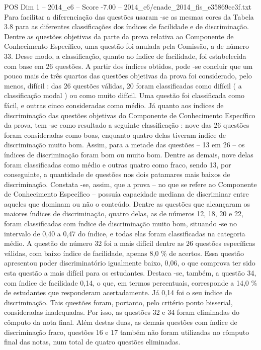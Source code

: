 \begin{textsample}{POS Dim 1 – 2014\_c6 – Score -7.00 – 2014\_c6/enade\_2014\_fis\_e35869ce3f.txt}
Para facilitar a diferenciação das questões usaram -se as mesmas cores da Tabela 3.8 para as diferentes classificações dos índices de facilidade e de discriminação.
Dentre as questões objetivas da parte da prova relativa ao Componente de Conhecimento Específico, uma questão foi anulada pela Comissão, a de número 33.
Desse modo, a classificação, quanto ao índice de facilidade, foi estabelecida com base em 26 questões.
A partir dos índices obtidos, pode -se concluir que um pouco mais de três quartos das questões objetivas da prova foi considerado, pelo menos, difícil : das 26 questões válidas, 20 foram classificadas como difícil ( a classificação modal ) ou como muito difícil.
Uma questão foi classificada como fácil, e outras cinco consideradas como médio.
Já quanto aos índices de discriminação das questões objetivas do Componente de Conhecimento Específico da prova, tem -se como resultado a seguinte classificação : nove das 26 questões foram consideradas como boas, enquanto quatro delas tiveram índice de discriminação muito bom.
Assim, para a metade das questões – 13 em 26 – os índices de discriminação foram bom ou muito bom.
Dentre as demais, nove delas foram classificadas como médio e outras quatro como fraco, sendo 13, por conseguinte, a quantidade de questões nos dois patamares mais baixos de discriminação.
Constata -se, assim, que a prova – no que se refere ao Componente de Conhecimento Específico – possuía capacidade mediana de discriminar entre aqueles que dominam ou não o conteúdo.
Dentre as questões que alcançaram os maiores índices de discriminação, quatro delas, as de números 12, 18, 20 e 22, foram classificadas com índice de discriminação muito bom, situando -se no intervalo de 0,40 a 0,47 do índice, e todas elas foram classificadas na categoria médio.
A questão de número 32 foi a mais difícil dentre as 26 questões específicas válidas, com baixo índice de facilidade, apenas 8,0 \% de acertos.
Essa questão apresentou poder discriminatório igualmente baixo, 0,06, o que comprova ter sido esta questão a mais difícil para os estudantes.
Destaca -se, também, a questão 34, com índice de facilidade 0,14, o que, em termos percentuais, corresponde a 14,0 \% de estudantes que responderam acertadamente.
Já 0,14 foi o seu índice de discriminação.
Tais questões foram, portanto, pelo critério ponto bisserial, consideradas inadequadas.
Por isso, as questões 32 e 34 foram eliminadas do cômputo da nota final.
Além destas duas, as demais questões com índice de discriminação fraco, questões 16 e 17 também não foram utilizadas no cômputo final das notas, num total de quatro questões eliminadas.

\end{textsample}
